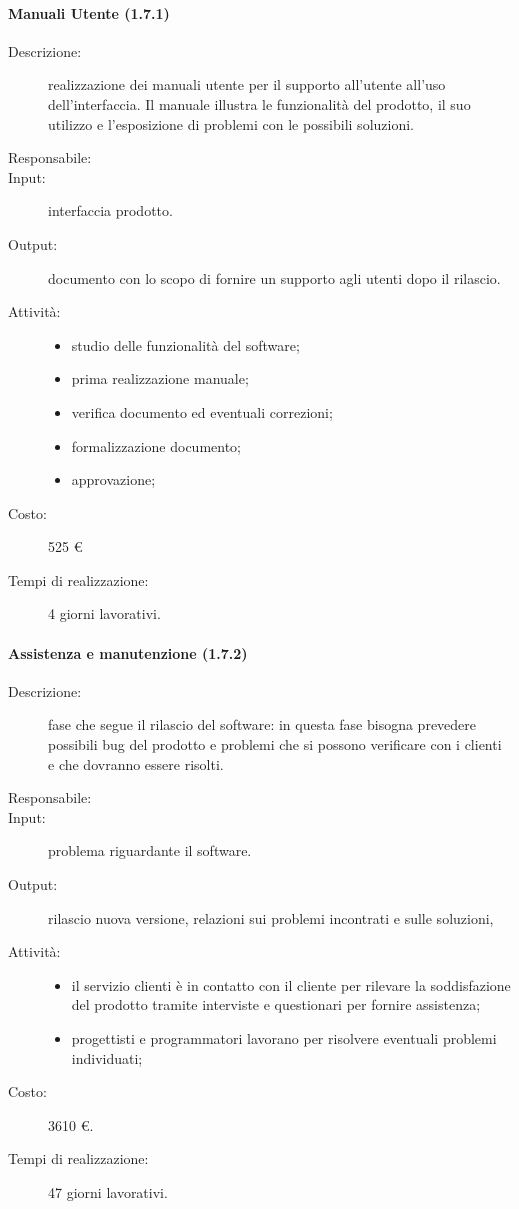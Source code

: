 \paragraph{Manuali Utente (1.7.1)}
\begin{description}
\item[Descrizione:] realizzazione dei manuali utente per il supporto all'utente all'uso dell'interfaccia. Il manuale illustra le funzionalit\`{a} del prodotto, il suo utilizzo e l'esposizione di problemi con le possibili soluzioni.
\item[Responsabile:] 
\item[Input:] interfaccia prodotto.
\item[Output:] documento con lo scopo di fornire un supporto agli utenti dopo il rilascio.
\item[Attivit\`{a}:] 
\begin{center}
\begin{itemize}
\item studio delle funzionalit\`{a} del software;
\item prima realizzazione manuale;
\item verifica documento ed eventuali correzioni;
\item formalizzazione documento;
\item approvazione;
\end{itemize}
\end{center}
\item[Costo:] 525 \euro{}
\item[Tempi di realizzazione:] 4 giorni lavorativi.
\end{description}

\paragraph{Assistenza e manutenzione (1.7.2)}
\begin{description}
\item[Descrizione:] fase che segue il rilascio del software: in questa fase bisogna prevedere
possibili bug del prodotto e problemi che si possono verificare con i clienti e che dovranno essere risolti.
\item[Responsabile:] 
\item[Input:] problema riguardante il software.
\item[Output:] rilascio nuova versione, relazioni sui problemi incontrati e sulle soluzioni,
\item[Attivit\`{a}:] 
\begin{center}
\begin{itemize}
\item il servizio clienti \`{e} in contatto con il cliente per rilevare la
soddisfazione del prodotto tramite interviste e questionari per fornire assistenza;
\item progettisti e programmatori lavorano per risolvere eventuali problemi individuati;
\end{itemize}
\end{center}
\item[Costo:] 3610 \euro{}.
\item[Tempi di realizzazione:] 47 giorni lavorativi.
\end{description}


